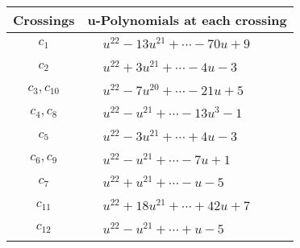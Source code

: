 \documentclass[1p]{elsarticle_modified}
\theoremstyle{definition}
\begin{document}
\begin{tabular}{m{50pt}|m{274pt}}
Crossings & \hspace{64pt}u-Polynomials at each crossing \\
\hline $$\begin{aligned}c_{1}\end{aligned}$$&$\begin{aligned}
&u^{22}-13 u^{21}+\cdots-70 u+9
\end{aligned}$\\
\hline $$\begin{aligned}c_{2}\end{aligned}$$&$\begin{aligned}
&u^{22}+3 u^{21}+\cdots-4 u-3
\end{aligned}$\\
\hline $$\begin{aligned}c_{3},c_{10}\end{aligned}$$&$\begin{aligned}
&u^{22}-7 u^{20}+\cdots-21 u+5
\end{aligned}$\\
\hline $$\begin{aligned}c_{4},c_{8}\end{aligned}$$&$\begin{aligned}
&u^{22}- u^{21}+\cdots-13 u^3-1
\end{aligned}$\\
\hline $$\begin{aligned}c_{5}\end{aligned}$$&$\begin{aligned}
&u^{22}-3 u^{21}+\cdots+4 u-3
\end{aligned}$\\
\hline $$\begin{aligned}c_{6},c_{9}\end{aligned}$$&$\begin{aligned}
&u^{22}- u^{21}+\cdots-7 u+1
\end{aligned}$\\
\hline $$\begin{aligned}c_{7}\end{aligned}$$&$\begin{aligned}
&u^{22}+u^{21}+\cdots- u-5
\end{aligned}$\\
\hline $$\begin{aligned}c_{11}\end{aligned}$$&$\begin{aligned}
&u^{22}+18 u^{21}+\cdots+42 u+7
\end{aligned}$\\
\hline $$\begin{aligned}c_{12}\end{aligned}$$&$\begin{aligned}
&u^{22}- u^{21}+\cdots+u-5
\end{aligned}$\\
\hline
\end{tabular}\\~\\
\end{document}
